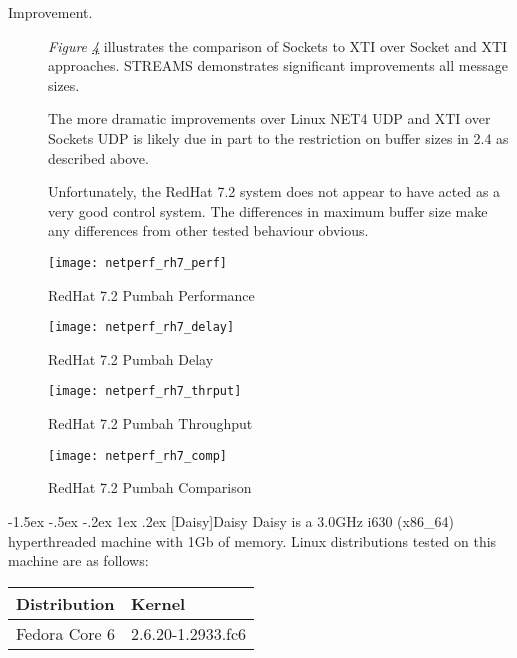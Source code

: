 \documentclass[letterpaper,final,notitlepage,twocolumn,10pt,twoside]{article}
\makeatletter
\renewcommand\subsection{\@startsection{subsection}{2}{\z@}%
                                     {-1.5ex \@plus -.5ex \@minus -.2ex}%
                                     {1ex \@plus .2ex}%
                                     {\normalfont\normalsize\bfseries}}
\makeatother
\begin{document}
\begin{description}
\item[Improvement.]

\textit{Figure \ref{figure:rh7comp}}
illustrates
the comparison of Sockets to XTI over Socket and XTI approaches.  STREAMS
demonstrates significant improvements all message sizes.

The more dramatic improvements over Linux NET4 UDP and XTI over Sockets UDP is
likely due in part to the restriction on buffer sizes in 2.4 as described
above.

Unfortunately, the RedHat 7.2 system does not appear to have acted as a very
good control system.  The differences in maximum buffer size make any
differences from other tested behaviour obvious.

\end{description}

\begin{figure}[p]
\center\texttt{[image: netperf\_rh7\_perf]}
\caption[RedHat 7.2 Pumbah Performance]{RedHat 7.2 Pumbah Performance}
\label{figure:rh7perf}
\end{figure}

\begin{figure}[p]
\center\texttt{[image: netperf\_rh7\_delay]}
\caption[RedHat 7.2 Pumbah Delay]{RedHat 7.2 Pumbah Delay}
\label{figure:rh7dly}
\end{figure}

\begin{figure}[p]
\center\texttt{[image: netperf\_rh7\_thrput]}
\caption[RedHat 7.2 Pumbah Throughput]{RedHat 7.2 Pumbah Throughput}
\label{figure:rh7thrput}
\end{figure}

\begin{figure}[p]
\center\texttt{[image: netperf\_rh7\_comp]}
\caption[RedHat 7.2 Pumbah Comparison]{RedHat 7.2 Pumbah Comparison}
\label{figure:rh7comp}
\end{figure}

\subsection[Daisy]{Daisy}
Daisy is a 3.0GHz i630 (x86\_64) hyperthreaded machine with 1Gb of memory.
Linux distributions tested on this machine are as follows:

\begin{tabular}{ll}\\
Distribution & Kernel\\
\hline
Fedora Core 6 & 2.6.20-1.2933.fc6\\
\end{tabular}\\[1.0ex]
\end{document}
